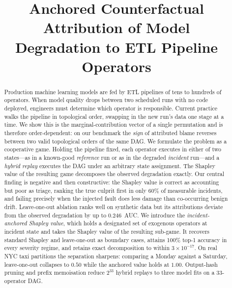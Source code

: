 \documentclass[conference]{IEEEtran}
\begin{document}
\title{Anchored Counterfactual Attribution of Model\\Degradation to ETL Pipeline Operators}

\author{
\and
{}
}

\maketitle

\begin{abstract}
Production machine learning models are fed by ETL pipelines of tens to hundreds
of operators. When model quality drops between two scheduled runs with no code
deployed, engineers must determine which operator is responsible. Current
practice walks the pipeline in topological order, swapping in the new run's data
one stage at a time. We show this is the marginal-contribution vector of a single
permutation and is therefore order-dependent: on our benchmark the \emph{sign} of
attributed blame reverses between two valid topological orders of the same DAG.
We formulate the problem as a cooperative game. Holding the pipeline fixed, each
operator executes in either of two states---as in a known-good \emph{reference}
run or as in the degraded \emph{incident} run---and a \emph{hybrid replay}
executes the DAG under an arbitrary state assignment. The Shapley value of the
resulting game decomposes the observed degradation exactly. Our central finding
is negative and then constructive: the Shapley value is correct as accounting but
poor as triage, ranking the true culprit first in only 60\% of measurable
incidents, and failing precisely when the injected fault does less damage than
co-occurring benign drift. Leave-one-out ablation ranks well on synthetic data
but its attributions deviate from the observed degradation by up to $0.246$~AUC.
We introduce the \emph{incident-anchored Shapley value}, which holds a designated
set of exogenous operators at incident state and takes the Shapley value of the
resulting sub-game. It recovers standard Shapley and leave-one-out as boundary
cases, attains 100\% top-1 accuracy in every severity regime, and retains exact
decomposition to within $3\times10^{-17}$. On real NYC taxi partitions the
separation sharpens: comparing a Monday against a Saturday, leave-one-out
collapses to $0.50$ while the anchored value holds at $1.00$. Output-hash pruning
and prefix memoisation reduce $2^{33}$ hybrid replays to three model fits on a
33-operator DAG.
\end{abstract}
\end{document}
